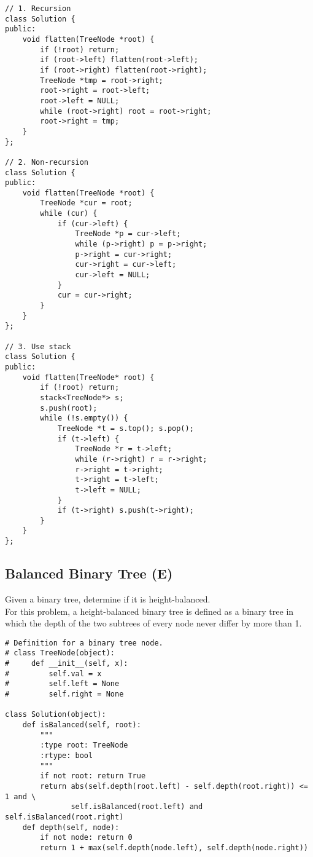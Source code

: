 \begin{lstlisting}
// 1. Recursion
class Solution {
public:
    void flatten(TreeNode *root) {
        if (!root) return;
        if (root->left) flatten(root->left);
        if (root->right) flatten(root->right);
        TreeNode *tmp = root->right;
        root->right = root->left;
        root->left = NULL;
        while (root->right) root = root->right;
        root->right = tmp;
    }
};

// 2. Non-recursion
class Solution {
public:
    void flatten(TreeNode *root) {
        TreeNode *cur = root;
        while (cur) {
            if (cur->left) {
                TreeNode *p = cur->left;
                while (p->right) p = p->right;
                p->right = cur->right;
                cur->right = cur->left;
                cur->left = NULL;
            }
            cur = cur->right;
        }
    }
};

// 3. Use stack
class Solution {
public:
    void flatten(TreeNode* root) {
        if (!root) return;
        stack<TreeNode*> s;
        s.push(root);
        while (!s.empty()) {
            TreeNode *t = s.top(); s.pop();
            if (t->left) {
                TreeNode *r = t->left;
                while (r->right) r = r->right;
                r->right = t->right;
                t->right = t->left;
                t->left = NULL;
            }
            if (t->right) s.push(t->right);
        }
    }
};
\end{lstlisting}


\subsection{Balanced Binary Tree (E)}
Given a binary tree, determine if it is height-balanced.\\

For this problem, a height-balanced binary tree is defined as a binary tree in which the depth of the two subtrees of every node never differ by more than 1. \\

\begin{lstlisting}
# Definition for a binary tree node.
# class TreeNode(object):
#     def __init__(self, x):
#         self.val = x
#         self.left = None
#         self.right = None

class Solution(object):
    def isBalanced(self, root):
        """
        :type root: TreeNode
        :rtype: bool
        """
        if not root: return True
        return abs(self.depth(root.left) - self.depth(root.right)) <= 1 and \
               self.isBalanced(root.left) and self.isBalanced(root.right)
    def depth(self, node):
        if not node: return 0
        return 1 + max(self.depth(node.left), self.depth(node.right))
\end{lstlisting}

